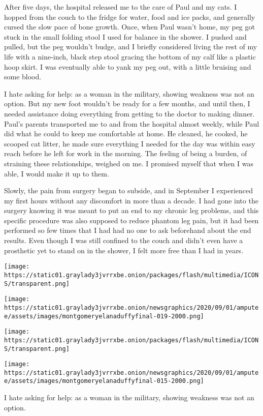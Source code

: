 After five days, the hospital released me to the care of Paul and my
cats. I hopped from the couch to the fridge for water, food and ice
packs, and generally cursed the slow pace of bone growth. Once, when
Paul wasn't home, my peg got stuck in the small folding stool I used for
balance in the shower. I pushed and pulled, but the peg wouldn't budge,
and I briefly considered living the rest of my life with a nine-inch,
black step stool gracing the bottom of my calf like a plastic hoop
skirt. I was eventually able to yank my peg out, with a little bruising
and some blood.

I hate asking for help: as a woman in the military, showing weakness was
not an option. But my new foot wouldn't be ready for a few months, and
until then, I needed assistance doing everything from getting to the
doctor to making dinner. Paul's parents transported me to and from the
hospital almost weekly, while Paul did what he could to keep me
comfortable at home. He cleaned, he cooked, he scooped cat litter, he
made sure everything I needed for the day was within easy reach before
he left for work in the morning. The feeling of being a burden, of
straining these relationships, weighed on me. I promised myself that
when I was able, I would make it up to them.

Slowly, the pain from surgery began to subside, and in September I
experienced my first hours without any discomfort in more than a decade.
I had gone into the surgery knowing it was meant to put an end to my
chronic leg problems, and this specific procedure was also supposed to
reduce phantom leg pain, but it had been performed so few times that I
had had no one to ask beforehand about the end results. Even though I
was still confined to the couch and didn't even have a prosthetic yet to
stand on in the shower, I felt more free than I had in years.

\texttt{[image: https://static01.graylady3jvrrxbe.onion/packages/flash/multimedia/ICONS/transparent.png]}

\texttt{[image: https://static01.graylady3jvrrxbe.onion/newsgraphics/2020/09/01/amputee/assets/images/montgomeryelanaduffyfinal-019-2000.png]}

\texttt{[image: https://static01.graylady3jvrrxbe.onion/packages/flash/multimedia/ICONS/transparent.png]}

\texttt{[image: https://static01.graylady3jvrrxbe.onion/newsgraphics/2020/09/01/amputee/assets/images/montgomeryelanaduffyfinal-015-2000.png]}

I hate asking for help: as a woman in the military, showing weakness was
not an option.

